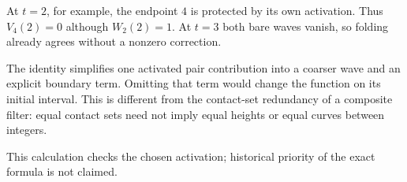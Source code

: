 At $t=2$, for example, the endpoint $4$ is protected by its own activation.
Thus $V_4(2)=0$ although $W_2(2)=1$. At $t=3$ both bare waves vanish, so
folding already agrees without a nonzero correction.

The identity simplifies one activated pair contribution into a coarser wave
and an explicit boundary term. Omitting that term would change the function
on its initial interval. This is different from the contact-set redundancy
of a composite filter: equal contact sets need not imply equal heights or
equal curves between integers.

This calculation checks the chosen activation; historical priority of the
exact formula is not claimed.
